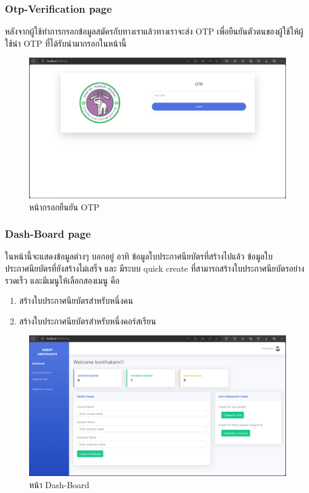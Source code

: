 \subsubsection{Otp-Verification page} 
\enskip \enskip \enskip \enskip \enskip
หลังจากผู้ใช้ทำการกรอกข้อมูลสมัครกับทางเราแล้วทางเราจะส่ง OTP เพื่อยืนยันตัวตนของผู้ใช้ให้ผู้ใช้นำ OTP ที่ได้รับนำมากรอกในหน้านี้
\graphicspath{ {./images/} }
\begin{figure}[htbp]
  \centering 
  \includegraphics[scale=0.3]{otp.png}
  \caption[หน้ากรอกยืนยัน OTP]{หน้ากรอกยืนยัน OTP}
  \label{fig:Otp}
\end{figure}

\subsubsection{Dash-Board page} 
\enskip \enskip \enskip \enskip \enskip
ในหน้านี้จะแสดงข้อมูลต่างๆ บอกอยู่ อาทิ ข้อมูลใบประกาศนียบัตรที่สร้างไปแล้ว ข้อมูลใบประกาศนียบัตรที่ยังสร้างไม่เสร็จ และ มีระบบ quick create ที่สามารถสร้างใบประกาศนียบัตรอย่างรวดเร็ว และมีเมนูให้เลือกสองเมนู คือ 
\begin{enumerate}
  \item สร้างใบประกาศนียบัตรสำหรับหนึ่งคน
  \item สร้างใบประกาศนียบัตรสำหรับหนึ่งคอร์สเรียน
  \end{enumerate}
\graphicspath{ {./images/} }
\begin{figure}[htbp]
  \centering 
  \includegraphics[scale=0.3]{dash.png}
  \caption[หน้า Dash-Board]{หน้า Dash-Board}
  \label{fig:Dash-Board}
\end{figure}

